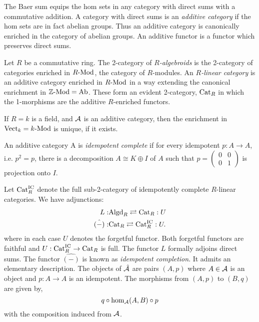 \documentclass{amsart}
\begin{document}
The Baer sum equips the hom sets in any category with direct sums with a commutative addition. 
A category with direct sums is an {\em additive category} if the hom sets are in fact abelian groups. Thus an additive category is canonically enriched in the category of abelian groups. An additive functor is a functor which preserves direct sums. 

\begin{definition}
	Let $R$ be a commutative ring. The 2-category of {\em $R$-algebroids} is the 2-category of categories enriched in $\Mod{R}{}$, the category of $R$-modules. An {\em $R$-linear category} is an additive category enriched in $\Mod{R}{}$ in a way extending the canonical enrichment in $\Mod{\ZZ}{} = \Ab$. These form an evident 2-category, $\mathrm{Cat}_R$ in which the 1-morphisms are the additive $R$-enriched functors. 
\end{definition}

\begin{remark}
	If $R = k$ is a field, and $\mathcal A$ is an additive category, then the enrichment in $\Vect_k = \Mod{k}{}$ is unique, if it exists. 
\end{remark}

\begin{definition}
	An additive category A is {\em idempotent complete} \cite[1.2.1, 1.2.2]{Karoubi68} if for
	every idempotent $p: A \to A$, i.e. $p^2 = p$, there is a decomposition $A \cong K \oplus I$ of $A$ such that $p = \left( \begin{array}{cc} 0 & 0 \\ 0 & 1 \end{array}\right)$ is projection onto $I$. 
\end{definition}

Let $\mathrm{Cat}_R^\text{IC}$ denote the full sub-2-category of idempotently complete $R$-linear categories. We have adjunctions:
\begin{align*}
		L:  & \mathrm{Algd}_R   \rightleftarrows \mathrm{Cat}_R : U \\
		\hat{(-)}:  & \mathrm{Cat}_R \rightleftarrows \mathrm{Cat}_R^\textrm{IC} : U. 
\end{align*}
where in each case $U$ denotes the forgetful functor. Both forgetful functors are faithful and $U: \mathrm{Cat}_R^\textrm{IC} \to \mathrm{Cat}_R$ is full. 
The functor $L$ formally adjoins direct sums. The functor $\hat{(-)}$ is known as {\em idempotent completion}. It admits an elementary description. The objects of $\hat {\mathcal A}$ are pairs $(A, p)$ where $A \in \mathcal A$ is an object and $p: A \to A$ is an idempotent. The morphisms from $(A, p)$ to $(B,q)$ are given by,
\begin{equation*}
	q \circ \hom_\mathcal A(A, B) \circ p
\end{equation*} 
with the composition induced from $\mathcal A$.
\end{document}
